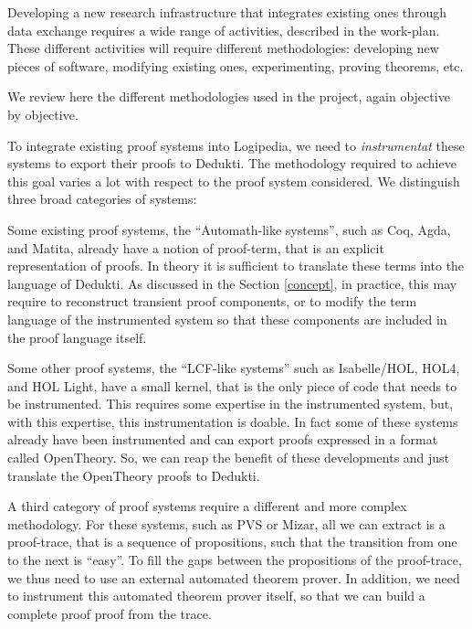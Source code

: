Developing a new research infrastructure that integrates existing
ones through data exchange requires a wide range of activities,
described in the work-plan. These different activities will require
different methodologies: developing new pieces of software,
modifying existing ones, experimenting, proving theorems, etc.

We review here the different methodologies used in the project, again 
objective by objective.


To integrate existing proof systems into Logipedia, we need to
\emph{instrumentat} these systems to export their proofs to Dedukti. The
methodology required to achieve this goal varies a lot with respect to
the proof system considered. We distinguish three broad categories of
systems:

\begin{compactitem}
\item
Some existing proof systems, the ``Automath-like systems'', such as Coq, Agda, and
Matita, already have a notion of proof-term, that is an explicit
representation of proofs.  In theory it is sufficient to translate
these terms into the language of Dedukti.  As discussed in the Section
\ref{concept}, in practice, this may require to reconstruct transient
proof components, or to modify the term language of the instrumented
system so that these components are included in the proof language
itself.

\item
Some other proof systems, the ``LCF-like systems'' such as
Isabelle/HOL, HOL4, and HOL Light, have a small kernel, that is the
only piece of code that needs to be instrumented. This requires some
expertise in the instrumented system, but, with this expertise, this
instrumentation is doable. In fact some of these systems already have
been instrumented and can export proofs expressed in a format called
OpenTheory. So, we can reap the benefit of these developments and just
translate the OpenTheory proofs to Dedukti.

\item A third category of proof systems require a different and more
  complex methodology. For these systems, such as PVS or Mizar, all we
  can extract is a proof-trace, that is a sequence of propositions,
  such that the transition from one to the next is ``easy''.
  To fill the gaps between the propositions of the proof-trace,
  we thus need to use an external automated theorem prover. In
  addition, we need to instrument this automated theorem prover
  itself, so that we can build a complete proof proof from the trace.
\end{compactitem}


